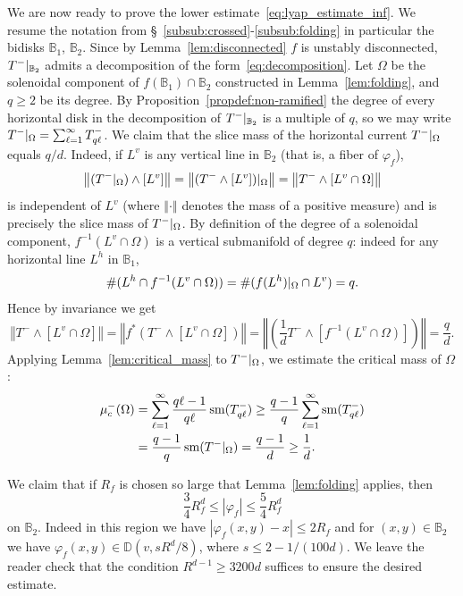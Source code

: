 \documentclass[oneside, 12pt]{amsart}
\newcommand{\disk}{\mathbb{D}}
\newcommand{\norm}[1]{{\left\Vert#1\right\Vert}}
\newcommand{\abs}[1]{\left\vert#1\right\vert}
\newcommand{\rest}[1]{ \arrowvert_{#1}}
\newcommand{\unsur}[1]{\frac{1}{#1}}
\newcommand{\lrpar}[1]{\left(#1\right)}
\newcommand{\inv}{^{-1}}
\DeclareMathOperator{\sm}{sm}
\newcommand{\bb}{\mathbb{B}}
\theoremstyle{plain}
\theoremstyle{definition}
\numberwithin{equation}{section}       %
\numberwithin{equation}{section}       %
\begin{document}
We are now ready to prove    the lower estimate~\eqref{eq:lyap_estimate_inf}. 
 We resume the notation from \S~\ref{subsub:crossed}-\ref{subsub:folding} in particular  the bidisks $\bb_1$, $\bb_2$. 
Since by Lemma~\ref{lem:disconnected}
$f$ is unstably disconnected,  %
  $T^-\rest{\bb_2}$ 
admits a decomposition of the form~\eqref{eq:decomposition}. 
Let $\Omega$ be the solenoidal component of $f(\bb_1)\cap \bb_2$ constructed in Lemma~\ref{lem:folding}, and $q\geq 2$ be its degree. 
By Proposition~\ref{propdef:non-ramified} the degree of every horizontal disk 
in the decomposition of   $T^-\rest{\bb_2}$ is a multiple of $q$, so  we may write 
   $T^-\rest{\Omega} = \sum_{\ell=1}^\infty T^-_{q\ell}$. 
We claim that the slice mass of the horizontal current 
$T^-\rest{\Omega}$ equals $q/d$. Indeed, if $L^v$ is any vertical line in $\bb_2$ 
(that is, a fiber of $\varphi_f$), 
\begin{equation}\label{eq:Lomega}
\norm{(T^-\rest {\Omega})\wedge [L^v]}  = \norm{(T^-\wedge[L^v])\rest{\Omega}}= 
\norm{T^-\wedge [L^v\cap\Omega]}
 \end{equation}
is independent of $L^v$ (where $\norm{\cdot}$ denotes the mass of a positive measure)
and is precisely the slice mass of $T^-\rest{\Omega}$.
By definition of the degree of a solenoidal component, 
$f\inv(L^v\cap \Omega)$ is a vertical submanifold of degree $q$: indeed 
 for any horizontal line $L^h$ in $\bb_1$, 
 \[
 \# (L^h\cap f\inv(L^v\cap \Omega)) = \# (f(L^h)\rest{ \Omega}\cap L^v) = q.
 \] Hence 
by    invariance we get  
\begin{equation}\label{eq:muc}
\norm{T^-\wedge [L^v\cap\Omega]} = \norm{f^*(T^-\wedge [L^v\cap \Omega])}
= \norm{\lrpar{\unsur{d}T^- \wedge [f\inv(L^v\cap \Omega)]}} = \frac{q}{d}.
\end{equation}
Applying Lemma~\ref{lem:critical_mass} to $T^-\rest{\Omega}$, 
we estimate the critical mass of $\Omega$:
\begin{align}
 \mu^-_c(\Omega) & = 
  \sum_{\ell=1}^\infty \frac{q\ell-1}{q\ell} \sm(T^-_{q\ell})  
  \geq \frac{q-1}{q}  \sum_{\ell=1}^\infty \sm(T^-_{q\ell}) 
 \\
  &\notag =  \frac{q-1}{q} \sm (T^-\rest{\Omega})  = \frac{q-1}{d}\geq \frac1d.  
\end{align}
 
We claim that if $R_f$ is chosen so large that    Lemma~\ref{lem:folding} applies, then
  \begin{equation}\label{eq:3/4-5/4} \frac34 R_f^d \leq \abs{\varphi_f}\leq \frac54R_f^d \end{equation} 
  on $\bb_2$. Indeed in this region we have $\abs{\varphi_f(x,y) - x}\leq 2R_f$ and 
for $(x,y)\in \bb_2$ we have $\varphi_f(x,y)\in \disk(v, sR^d/8)$, where $s\leq 2 - 1/(100d)$. We leave the reader check that the condition $R^{d-1}\geq 3200d$ suffices to ensure the desired estimate.
  
\end{document}
